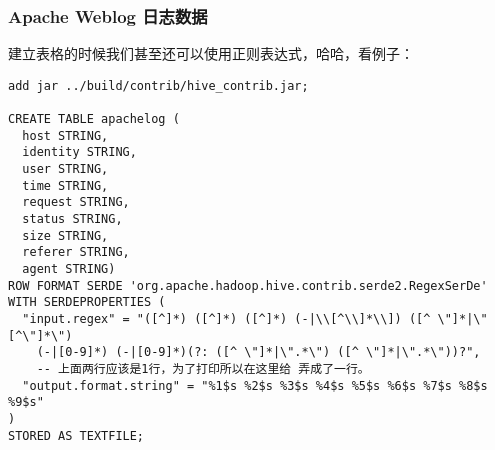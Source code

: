 \documentclass{article}
\begin{document}
\subsubsection{Apache Weblog 日志数据}
建立表格的时候我们甚至还可以使用正则表达式，哈哈，看例子：

\begin{verbatim}
add jar ../build/contrib/hive_contrib.jar;

CREATE TABLE apachelog (
  host STRING,
  identity STRING,
  user STRING,
  time STRING,
  request STRING,
  status STRING,
  size STRING,
  referer STRING,
  agent STRING)
ROW FORMAT SERDE 'org.apache.hadoop.hive.contrib.serde2.RegexSerDe'
WITH SERDEPROPERTIES (
  "input.regex" = "([^]*) ([^]*) ([^]*) (-|\\[^\\]*\\]) ([^ \"]*|\"[^\"]*\") 
	(-|[0-9]*) (-|[0-9]*)(?: ([^ \"]*|\".*\") ([^ \"]*|\".*\"))?",
	-- 上面两行应该是1行，为了打印所以在这里给 弄成了一行。
  "output.format.string" = "%1$s %2$s %3$s %4$s %5$s %6$s %7$s %8$s %9$s"
)
STORED AS TEXTFILE;
\end{verbatim}
\end{document}
